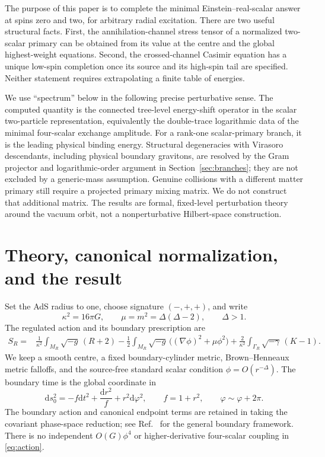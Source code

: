 \documentclass[11pt,a4paper]{article}
\numberwithin{equation}{section}
\theoremstyle{remark}\newtheorem{remark}[theorem]{Remark}
\newcommand{\dd}{\mathrm d}
\newcommand{\kap}{\kappa}
\begin{document}
The purpose of this paper is to complete the minimal Einstein--real-scalar answer at spins zero and two, for arbitrary radial excitation. There are two useful structural facts. First, the annihilation-channel stress tensor of a normalized two-scalar primary can be obtained from its value at the centre and the global highest-weight equations. Second, the crossed-channel Casimir equation has a unique low-spin completion once its source and its high-spin tail are specified. Neither statement requires extrapolating a finite table of energies.

We use ``spectrum'' below in the following precise perturbative sense. The computed quantity is the connected tree-level energy-shift operator in the scalar two-particle representation, equivalently the double-trace logarithmic data of the minimal four-scalar exchange amplitude. For a rank-one scalar-primary branch, it is the leading physical binding energy. Structural degeneracies with Virasoro descendants, including physical boundary gravitons, are resolved by the Gram projector and logarithmic-order argument in Section~\ref{sec:branches}; they are not excluded by a generic-mass assumption. Genuine collisions with a different matter primary still require a projected primary mixing matrix. We do not construct that additional matrix. The results are formal, fixed-level perturbation theory around the vacuum orbit, not a nonperturbative Hilbert-space construction.

\section{Theory, canonical normalization, and the result}
\label{sec:result}

Set the AdS radius to one, choose signature $(-,+,+)$, and write
\begin{equation}
 \kap^2=16\pi G,\qquad \mu=m^2=\Delta(\Delta-2),\qquad \Delta>1.
\end{equation}
The regulated action and its boundary prescription are
\begin{align}
 S_R={}&\frac1{\kap^2}\int_{M_R}\!\sqrt{-g}\,(R+2)
 -\frac12\int_{M_R}\!\sqrt{-g}\,\bigl((\nabla\phi)^2+\mu\phi^2\bigr)
 +\frac2{\kap^2}\int_{\Gamma_R}\!\sqrt{-\gamma}\,(K-1).
 \label{eq:action}
\end{align}
We keep a smooth centre, a fixed boundary-cylinder metric, Brown--Henneaux metric falloffs, and the source-free standard scalar condition $\phi=O(r^{-\Delta})$. The boundary time is the global coordinate in
\begin{equation}
 \dd s_0^2=-f\dd t^2+\frac{\dd r^2}{f}+r^2\dd\varphi^2,
 \qquad f=1+r^2,\qquad \varphi\sim\varphi+2\pi.
\end{equation}
The boundary action and canonical endpoint terms are retained in taking the covariant phase-space reduction; see Ref.~\cite{HW} for the general boundary framework. There is no independent $O(G)\phi^4$ or higher-derivative four-scalar coupling in \eqref{eq:action}.
\end{document}
